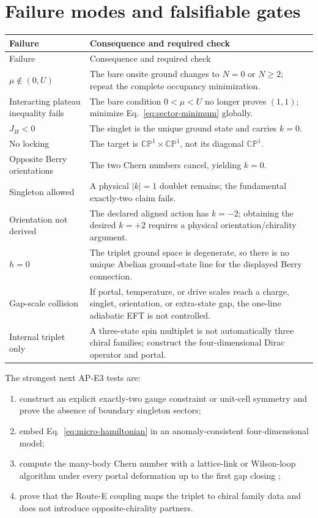 \documentclass[11pt]{article}
\theoremstyle{definition}
\theoremstyle{remark}
\newcommand{\CP}{\mathbb{CP}}
\begin{document}
\section{Failure modes and falsifiable gates}

\begin{longtable}{@{}>{\raggedright\arraybackslash}p{}
                       >{\raggedright\arraybackslash}p{}@{}}
\toprule
Failure & Consequence and required check\\
\midrule
\endfirsthead
\toprule
Failure & Consequence and required check\\
\midrule
\endhead
\(\mu\notin(0,U)\) & The bare onsite ground changes to \(N=0\) or
\(N\ge2\); repeat the complete occupancy minimization.\\
Interacting plateau inequality fails & The bare condition \(0<\mu<U\) no
longer proves \((1,1)\); minimize Eq.~\eqref{eq:sector-minimum} globally.\\
\(J_H<0\) & The singlet is the unique ground state and carries \(k=0\).\\
No locking & The target is \(\CP^1\times\CP^1\), not its diagonal
\(\CP^1\).\\
Opposite Berry orientations & The two Chern numbers cancel, yielding
\(k=0\).\\
Singleton allowed & A physical \(|k|=1\) doublet remains; the fundamental
exactly-two claim fails.\\
Orientation not derived & The declared aligned action has \(k=-2\); obtaining
the desired \(k=+2\) requires a physical orientation/chirality argument.\\
\(h=0\) & The triplet ground space is degenerate, so there is no unique
Abelian ground-state line for the displayed Berry connection.\\
Gap-scale collision & If portal, temperature, or drive scales reach a charge,
singlet, orientation, or extra-state gap, the one-line adiabatic EFT is not
controlled.\\
Internal triplet only & A three-state spin multiplet is not automatically
three chiral families; construct the four-dimensional Dirac operator and
portal.\\
\bottomrule
\end{longtable}

The strongest next AP-E3 tests are:
\begin{enumerate}
\item construct an explicit exactly-two gauge constraint or unit-cell
  symmetry and prove the absence of boundary singleton sectors;
\item embed Eq.~\eqref{eq:micro-hamiltonian} in an anomaly-consistent
  four-dimensional model;
\item compute the many-body Chern number with a lattice-link or Wilson-loop
  algorithm under every portal deformation up to the first gap closing
  \cite{FukuiHatsugaiSuzuki2005};
\item prove that the Route-E coupling maps the triplet to chiral family data
  and does not introduce opposite-chirality partners.
\end{enumerate}
\end{document}
